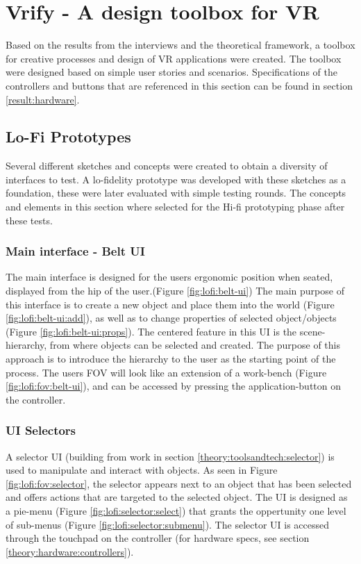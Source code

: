 \section{Vrify - A design toolbox for VR}
Based on the results from the interviews and the theoretical framework, a toolbox for creative processes and design of VR applications were created. The toolbox were designed based on simple user stories and scenarios. Specifications of the controllers and buttons that are referenced in this section can be found in section \ref{result:hardware}.

\subsection{Lo-Fi Prototypes}
 Several different sketches and concepts were created to obtain a diversity of interfaces to test. A lo-fidelity prototype was developed with these sketches as a foundation, these were later evaluated with simple testing rounds. The concepts and elements in this section where selected for the Hi-fi prototyping phase after these tests.

\subsubsection{Main interface - Belt UI}
The main interface is designed for the users ergonomic position when seated, displayed from the hip of the user.(Figure \ref{fig:lofi:belt-ui}) The main purpose of this interface is to create a new object and place them into the world (Figure \ref{fig:lofi:belt-ui:add}), as well as to change properties of selected object/objects (Figure \ref{fig:lofi:belt-ui:props}). The centered feature in this UI is the scene-hierarchy, from where objects can be selected and created. The purpose of this approach is to introduce the hierarchy to the user as the starting point of the process. The users FOV will look like an extension of a work-bench (Figure \ref{fig:lofi:fov:belt-ui}), and can be accessed by pressing the application-button on the controller.

\subsubsection{UI Selectors}
\label{result:lofi:selector}
A selector UI (building from work in section \ref{theory:toolsandtech:selector}) is used to manipulate and interact with objects. As seen in Figure \ref{fig:lofi:fov:selector}, the selector appears next to an object that has been selected and offers actions that are targeted to the selected object. The UI is designed as a pie-menu (Figure \ref{fig:lofi:selector:select}) that grants the oppertunity one level of sub-menus (Figure \ref{fig:lofi:selector:submenu}). The selector UI is accessed through the touchpad on the controller (for hardware specs, see section \ref{theory:hardware:controllers}).

